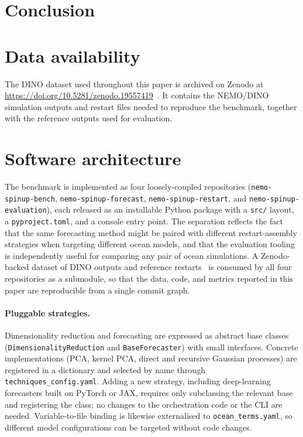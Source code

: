 \documentclass{article}
\begin{document}
\section{Conclusion}
\label{sec:conclusion}



\section*{Data availability}
\label{sec:data}

The DINO dataset used throughout this paper is archived on Zenodo at
\url{https://doi.org/10.5281/zenodo.19557419}~\citep{archer_dino_dataset_2026}.
It contains the NEMO/DINO simulation outputs and restart files needed to
reproduce the benchmark, together with the reference outputs used for
evaluation.





\appendix

\section{Software architecture}
\label{sec:architecture}

The benchmark is implemented as four loosely-coupled repositories
(\texttt{nemo-spinup-bench}, \texttt{nemo-spinup-forecast},
\texttt{nemo-spinup-restart}, and \texttt{nemo-spinup-evaluation}), each
released as an installable Python package with a \texttt{src/} layout, a
\texttt{pyproject.toml}, and a console entry point. The separation
reflects the fact that the same forecasting method might be paired with
different restart-assembly strategies when targeting different ocean
models, and that the evaluation tooling is independently useful for
comparing any pair of ocean simulations. A Zenodo-backed dataset of
DINO outputs and reference restarts~\citep{archer_dino_dataset_2026} is
consumed by all four repositories as a submodule, so that the data,
code, and metrics reported in this paper are reproducible from a single
commit graph.

\paragraph{Pluggable strategies.}
Dimensionality reduction and forecasting are expressed as abstract base
classes (\texttt{DimensionalityReduction} and \texttt{BaseForecaster})
with small interfaces. Concrete implementations (PCA, kernel PCA,
direct and recursive Gaussian processes) are registered in a dictionary
and selected by name through \texttt{techniques\_config.yaml}. Adding a
new strategy, including deep-learning forecasters built on PyTorch or
JAX, requires only subclassing the relevant base and registering the
class; no changes to the orchestration code or the CLI are needed.
Variable-to-file binding is likewise externalised to
\texttt{ocean\_terms.yaml}, so different model configurations can be
targeted without code changes.
\end{document}

